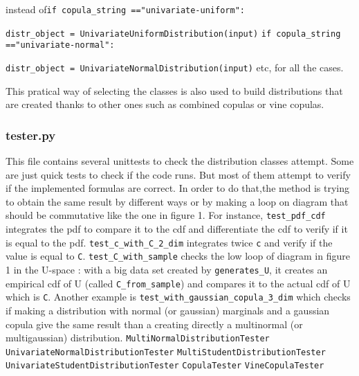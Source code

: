 \documentclass{article}
\begin{document}
     instead of\newline\texttt{if copula\_string =="univariate-uniform":}

    \texttt{distr\_object = UnivariateUniformDistribution(input)} \newline
    \texttt{if copula\_string =="univariate-normal":}

    \texttt{distr\_object = UnivariateNormalDistribution(input)} \newline etc, for all the cases. \newline

    This pratical way of selecting the classes is also used to build distributions that are created thanks to other ones such as combined copulas or vine copulas.

	 \subsubsection{tester.py}
	This file contains several unittests to check the distribution classes attempt. Some are just quick tests to check if the code runs. But most of them attempt to verify if the implemented formulas are correct. In order to do that,the method is trying to obtain the same result by different ways or by making a loop on diagram that should be commutative like the one in figure 1. For instance, \texttt{test\_pdf\_cdf} integrates the pdf to compare it to the cdf and differentiate the cdf to verify if it is equal to the pdf. \texttt{test\_c\_with\_C\_2\_dim} integrates twice \texttt{c} and verify if the value is equal to \texttt{C}. \texttt{test\_C\_with\_sample} checks the low loop of diagram in figure 1 in the U-space : with a big data set created by \texttt{generates\_U}, it creates an empirical cdf of U (called \texttt{C\_from\_sample}) and compares it to the actual cdf of U which is \texttt{C}. Another example is \texttt{test\_with\_gaussian\_copula\_3\_dim} which checks if making a distribution with normal (or gaussian) marginals and a gaussian copula give the same result than a creating directly a multinormal (or multigaussian) distribution. \newline
\newline
	 \texttt{MultiNormalDistributionTester} \newline
	 \texttt{UnivariateNormalDistributionTester} \newline
	 \texttt{MultiStudentDistributionTester} \newline
	 \texttt{UnivariateStudentDistributionTester}\newline
	 \texttt{CopulaTester} \newline
	 \texttt{VineCopulaTester}
\end{document}
